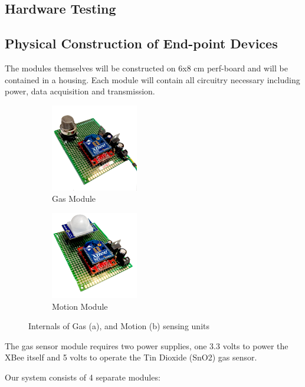 \documentclass[letter,twocolumn]{report}
\begin{document}
	\subsection{Hardware Testing}
		

	\subsection{Physical Construction of End-point Devices}
	\par The modules themselves will be constructed on 6x8 cm perf-board and will be contained in a housing. Each module will contain all circuitry necessary including power, data acquisition and transmission. 
	\begin{figure}[h!]
		\centering
		\begin{subfigure}[t]{0.45\textwidth}
			\centering
			\includegraphics[height=1.5in]{module_gas.jpg}
			\caption{Gas Module}
		\end{subfigure}
		\begin{subfigure}[t]{0.45\textwidth}
			\centering
			\includegraphics[height=1.5in]{module_motion.jpg}
			\caption{Motion Module}
		\end{subfigure}
		\caption{Internals of Gas (a), and Motion (b) sensing units}
	\end{figure}
	\par The gas sensor module requires two power supplies, one 3.3 volts to power the XBee itself and 5 volts to operate the Tin Dioxide (SnO2) gas sensor. \\
	\par Our system consists of 4 separate modules:
\end{document}
